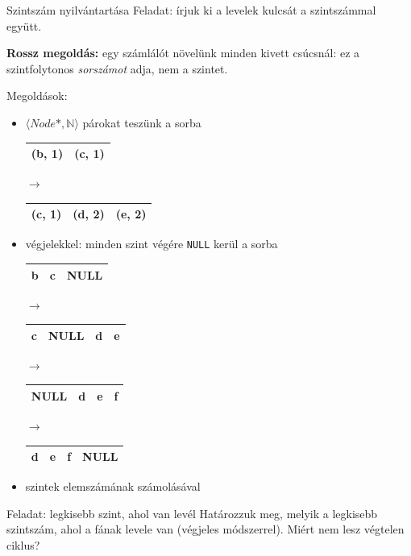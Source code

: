 \documentclass[hungarian]{beamer}
\begin{document}
\begin{frame}{Szintszám nyilvántartása}
Feladat: írjuk ki a levelek kulcsát a szintszámmal együtt.

\vspace{2mm}
\textbf{Rossz megoldás:} egy számlálót növelünk minden kivett csúcsnál: ez a szintfolytonos \emph{sorszámot} adja, nem a szintet.

\vspace{2mm}
Megoldások:
\begin{itemize}
    \item $\langle Node*, \mathbb{N}\rangle$ párokat teszünk a sorba
    \begin{tabular}{|c|c|}
        \hline
        (b, 1) & (c, 1) \\
        \hline
    \end{tabular} $\rightarrow$
    \begin{tabular}{|c|c|c|}
        \hline
        (c, 1) & (d, 2) & (e, 2) \\
        \hline
    \end{tabular}

    \item végjelekkel: minden szint végére \texttt{NULL} kerül a sorba
    \begin{tabular}{|c|c|c|}
        \hline
        b & c & NULL \\
        \hline
    \end{tabular} $\rightarrow$
    \begin{tabular}{|c|c|c|c|}
        \hline
        c & NULL & d & e \\
        \hline
    \end{tabular} $\rightarrow$
    \begin{tabular}{|c|c|c|c|}
        \hline
        NULL & d & e & f \\
        \hline
    \end{tabular} $\rightarrow$
    \begin{tabular}{|c|c|c|c|}
        \hline
        d & e & f & NULL \\
        \hline
    \end{tabular}
    \item szintek elemszámának számolásával
\end{itemize}
\end{frame}

\begin{frame}[t]{Feladat: legkisebb szint, ahol van levél}
Határozzuk meg, melyik a legkisebb szintszám, ahol a fának levele van (végjeles módszerrel). Miért nem lesz végtelen ciklus?
\end{frame}
\end{document}
